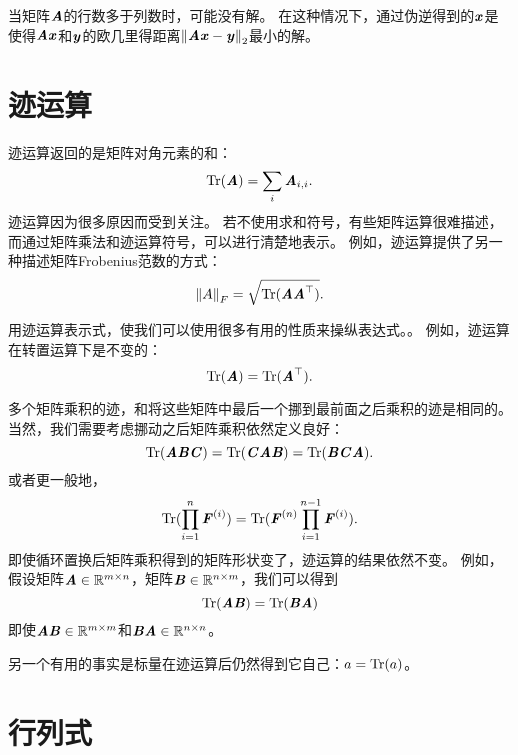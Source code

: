 当矩阵$\MA$的行数多于列数时，可能没有解。
在这种情况下，通过伪逆得到的$\Vx$是使得$\MA\Vx$和$\Vy$的欧几里得距离$\norm{\MA\Vx-\Vy}_2$最小的解。




\section{迹运算}
\label{sec:the_trace_operator}

迹运算返回的是矩阵对角元素的和：
\begin{equation}
    \Tr(\MA)= \sum_i \MA_{i,i}.
\end{equation}
迹运算因为很多原因而受到关注。
若不使用求和符号，有些矩阵运算很难描述，而通过矩阵乘法和迹运算符号，可以进行清楚地表示。
例如，迹运算提供了另一种描述矩阵Frobenius范数的方式：
\begin{equation}
\label{eq:2.49}
    \norm{A}_F = \sqrt{\text{Tr}(\MA \MA^\top)}.
\end{equation}


用迹运算表示式，使我们可以使用很多有用的性质来操纵表达式。。
例如，迹运算在转置运算下是不变的：
\begin{equation}
    \Tr(\MA)=\Tr(\MA^\top).
\end{equation}


多个矩阵乘积的迹，和将这些矩阵中最后一个挪到最前面之后乘积的迹是相同的。
当然，我们需要考虑挪动之后矩阵乘积依然定义良好：
\begin{equation}
\Tr(\MA\MB\MC)=\Tr(\MC\MA\MB)= \Tr(\MB\MC\MA).
\end{equation}
或者更一般地，
\begin{equation}
\Tr(\prod_{i=1}^n \MF^{(i)})= \Tr(\MF^{(n)} \prod_{i=1}^{n-1} \MF^{(i)}).
\end{equation}
即使循环置换后矩阵乘积得到的矩阵形状变了，迹运算的结果依然不变。
例如，假设矩阵$\MA\in \SetR^{m\times n}$，矩阵$\MB\in \SetR^{n\times m}$，我们可以得到
\begin{equation} 
    \Tr(\MA\MB)= \Tr(\MB\MA)
\end{equation}
即使$\MA\MB \in \SetR^{m\times m}$和$\MB\MA \in \SetR^{n\times n}$。



另一个有用的事实是标量在迹运算后仍然得到它自己：$a=\Tr(a)$。




\section{行列式}
\label{sec:the_determinant}

